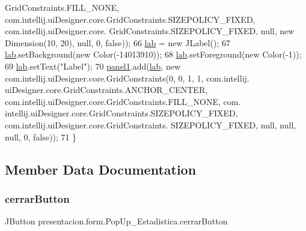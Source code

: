 \begin{DoxyCode}
      GridConstraints.FILL\_NONE, com.intellij.uiDesigner.core.GridConstraints.SIZEPOLICY\_FIXED, com.intellij.uiDesigner.core.
      GridConstraints.SIZEPOLICY\_FIXED, null, \textcolor{keyword}{new} Dimension(10, 20), null, 0, \textcolor{keyword}{false}));
66         \hyperlink{classpresentacion_1_1form_1_1PopUp__Estadistica_ac61ead9dea9a28c411062fdc951b4df8}{lab} = \textcolor{keyword}{new} JLabel();
67         \hyperlink{classpresentacion_1_1form_1_1PopUp__Estadistica_ac61ead9dea9a28c411062fdc951b4df8}{lab}.setBackground(\textcolor{keyword}{new} Color(-14013910));
68         \hyperlink{classpresentacion_1_1form_1_1PopUp__Estadistica_ac61ead9dea9a28c411062fdc951b4df8}{lab}.setForeground(\textcolor{keyword}{new} Color(-1));
69         \hyperlink{classpresentacion_1_1form_1_1PopUp__Estadistica_ac61ead9dea9a28c411062fdc951b4df8}{lab}.setText(\textcolor{stringliteral}{"Label"});
70         \hyperlink{classpresentacion_1_1form_1_1PopUp__Estadistica_ac276266d42b873f89883dd3a869feadf}{panel1}.add(\hyperlink{classpresentacion_1_1form_1_1PopUp__Estadistica_ac61ead9dea9a28c411062fdc951b4df8}{lab}, \textcolor{keyword}{new} com.intellij.uiDesigner.core.GridConstraints(0, 0, 1, 1, com.intellij.
      uiDesigner.core.GridConstraints.ANCHOR\_CENTER, com.intellij.uiDesigner.core.GridConstraints.FILL\_NONE, com.
      intellij.uiDesigner.core.GridConstraints.SIZEPOLICY\_FIXED, com.intellij.uiDesigner.core.GridConstraints.
      SIZEPOLICY\_FIXED, null, null, null, 0, \textcolor{keyword}{false}));
71     \}
\end{DoxyCode}


\subsection{Member Data Documentation}
\mbox{\label{classpresentacion_1_1form_1_1PopUp__Estadistica_aad708c3569f3d964b09867708ba60bf6}} 
\subsubsection{\texorpdfstring{cerrar\+Button}{cerrarButton}}
{\footnotesize\ttfamily J\+Button presentacion.\+form.\+Pop\+Up\+\_\+\+Estadistica.\+cerrar\+Button\hspace{0.3cm}{\ttfamily [private]}}


